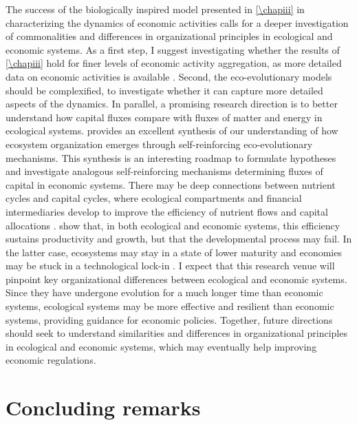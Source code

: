 The success of the biologically inspired model presented in \cref{\chapiii}  in characterizing the dynamics of economic activities calls for a deeper investigation of commonalities and differences in organizational principles in ecological and economic systems.
% 
As a first step, I suggest investigating whether the results of \cref{\chapiii} hold for finer levels of economic activity aggregation, as more detailed data on economic activities is available \citep{Hausmann2011}. 
% 
Second, the eco-evolutionary models should be complexified, to investigate whether it can capture more detailed aspects of the dynamics.
% 
In parallel, a promising research direction is to better understand how capital fluxes \citep{King1993} compare with fluxes of matter and energy \citep{Veldhuis2018} in ecological systems.
% 
\cite{Veldhuis2018} provides an excellent synthesis of our understanding of how ecosystem organization emerges through self-reinforcing eco-evolutionary mechanisms. This synthesis is an interesting roadmap to formulate hypotheses and investigate analogous self-reinforcing mechanisms determining fluxes of capital in economic systems. 
% 
There may be deep connections between nutrient cycles and capital cycles, where ecological compartments and financial intermediaries develop to improve the efficiency of nutrient flows and capital allocations \citep{Odum1969}.
% 
\cite{Veldhuis2018,King1993} show that, in both ecological and economic systems, this efficiency sustains productivity and growth, but that the developmental process may fail. In the latter case, ecosystems may stay in a state of lower maturity \citep{Margalef1963} and economies may be stuck in a technological lock-in \citep{C.A.HidalgoB.Klinger}. 
% 
I expect that this research venue will pinpoint key organizational differences between ecological and economic systems. Since they have undergone evolution for a much longer time than economic systems, ecological systems may be more effective and resilient than economic systems, providing guidance for economic policies.
% 
Together, future directions should seek to understand similarities and differences in organizational principles in ecological and economic systems, which may eventually help improving economic regulations.


\section{Concluding remarks}


